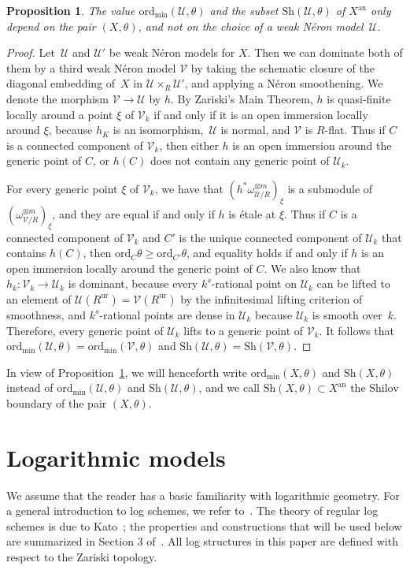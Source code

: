 \documentclass[JEP,XML,SOM,Unicode,NoFloatCountersInSection]{cedram}
\newtheorem{prop}[equation]{Proposition}
\theoremstyle{definition}
\numberwithin{equation}{subsection}
\newcommand{\cU}{\ensuremath{\mathscr{U}}}
\newcommand{\cV}{\ensuremath{\mathscr{V}}}
\newcommand{\an}{\mathrm{an}}
\newcommand{\ord}{\mathrm{ord}}
\newcommand{\ordmin}{\ord_{\min}}
\newcommand{\Sh}{\mathrm{Sh}}
\newcommand{\ur}{\mathrm{ur}}
\let\form\theta
\begin{document}
\begin{prop}\label{prop:indep}
The value $\ordmin(\cU,\form)$ and the subset $\Sh(\cU,\form)$ of $X^{\an}$ only depend on the pair $(X,\form)$, and not on the choice of a weak Néron model~$\cU$.
\end{prop}
\begin{proof}
Let~$\cU$ and $\cU'$ be weak Néron models for $X$. Then we can dominate both of them by a third weak Néron model $\cV$ by taking
the schematic closure of the diagonal embedding of~$X$ in $\cU\times_R \cU'$, and applying a Néron smoothening. We denote the morphism $\cV\to \cU$ by $h$.
By Zariski's Main Theorem, $h$ is quasi-finite locally around a point $\xi$ of $\cV_k$ if and only if it is an open immersion locally around $\xi$, because $h_K$ is an isomorphism,~$\cU$ is normal, and $\cV$ is $R$\nobreakdash-flat. Thus if $C$ is a connected component of $\cV_k$, then either $h$ is an open immersion around the generic point of $C$, or $h(C)$ does not contain any generic point of $\cU_k$.

For every generic point $\xi$ of $\cV_k$, we have that $(h^*\omega^{\otimes m}_{\cU/R})_{\xi}$ is a submodule of $(\omega^{\otimes m}_{\cV/R})_{\xi}$, and they are equal if and only if
$h$ is étale at $\xi$.
Thus if $C$ is a connected component of $\cV_k$ and $C'$ is the unique connected component of $\cU_k$ that contains $h(C)$, then
$\ord_{C}\form\geq \ord_{C'}\form$, and equality holds if and only if $h$ is an open immersion locally around the generic point of $C$.
We also know that $h_k:\cV_k\to \cU_k$ is dominant, because every $k^s$-rational point on $\cU_k$ can be lifted to an element of $\cU(R^{\ur})=\cV(R^{\ur})$ by the infinitesimal lifting criterion of smoothness, and $k^s$-rational points are dense in $\cU_k$ because $\cU_k$ is smooth over~$k$.
Therefore, every generic point of $\cU_k$ lifts to a generic point of $\cV_k$.
It follows that $\ordmin(\cU,\form)=\ordmin(\cV,\form)$
and $\Sh(\cU,\form)=\Sh(\cV,\form)$.
\end{proof}

In view of Proposition~\ref{prop:indep}, we will henceforth write $\ordmin(X,\form)$ and $\Sh(X,\form)$ instead of $\ordmin(\cU,\form)$ and $\Sh(\cU,\form)$, and we call
$\Sh(X,\form)\subset X^{\an}$ the Shilov boundary of the pair $(X,\form)$.

\section{Logarithmic models}\label{sec:log}
We assume that the reader has a basic familiarity with logarithmic geometry. For a general introduction to log schemes, we refer to~\cite{kato-log}. The theory of regular log schemes is due to Kato~\cite{kato}; the properties and constructions that will be used below are summarized in Section 3 of~\cite{logzeta}. All log structures in this paper are defined with respect to the Zariski topology.
\end{document}
